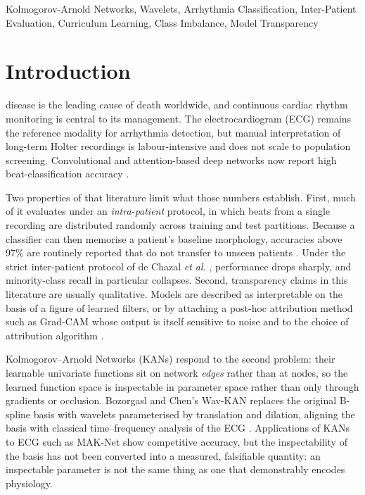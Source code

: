 \documentclass[journal,twoside,web]{ieeecolor}
\begin{document}
\begin{IEEEkeywords}
Kolmogorov-Arnold Networks, Wavelets, Arrhythmia Classification, Inter-Patient Evaluation, Curriculum Learning, Class Imbalance, Model Transparency
\end{IEEEkeywords}

\section{Introduction}

 disease is the leading cause of death worldwide, and continuous cardiac rhythm monitoring is central to its management. The electrocardiogram (ECG) remains the reference modality for arrhythmia detection, but manual interpretation of long-term Holter recordings is labour-intensive and does not scale to population screening. Convolutional and attention-based deep networks now report high beat-classification accuracy \cite{takalo-mattila_inter-patient_2018, guo_inter-patient_2019, akan_ecgformer_2024}.

Two properties of that literature limit what those numbers establish. First, much of it evaluates under an \emph{intra-patient} protocol, in which beats from a single recording are distributed randomly across training and test partitions. Because a classifier can then memorise a patient's baseline morphology, accuracies above 97\% are routinely reported that do not transfer to unseen patients \cite{bahrami_investigation_2025, xiao_deep_2023, silva_systematic_2025}. Under the strict inter-patient protocol of de Chazal \emph{et al.} \cite{chazal_automatic_2004}, performance drops sharply, and minority-class recall in particular collapses. Second, transparency claims in this literature are usually qualitative. Models are described as interpretable on the basis of a figure of learned filters, or by attaching a post-hoc attribution method such as Grad-CAM whose output is itself sensitive to noise and to the choice of attribution algorithm \cite{taleban_explainable_2025}.

Kolmogorov--Arnold Networks (KANs) \cite{liu_kan_2024} respond to the second problem: their learnable univariate functions sit on network \emph{edges} rather than at nodes, so the learned function space is inspectable in parameter space rather than only through gradients or occlusion. Bozorgasl and Chen's Wav-KAN \cite{bozorgasl_wavkan_2024} replaces the original B-spline basis with wavelets parameterised by translation and dilation, aligning the basis with classical time--frequency analysis of the ECG \cite{addison_wavelet_2005}. Applications of KANs to ECG such as MAK-Net \cite{zhao_mak-net_2025} show competitive accuracy, but the inspectability of the basis has not been converted into a measured, falsifiable quantity: an inspectable parameter is not the same thing as one that demonstrably encodes physiology.
\end{document}
